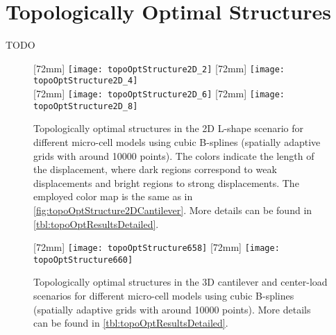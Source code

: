 \chapter{Topologically Optimal Structures}
\label{chap:a30structures}

TODO

\begin{figure}
  [72mm]{%
    \texttt{[image: topoOptStructure2D\_2]}%
  }%
  \hfill%
  [72mm]{%
    \texttt{[image: topoOptStructure2D\_4]}%
  }%
  \\[2mm]%
  [72mm]{%
    \texttt{[image: topoOptStructure2D\_6]}%
  }%
  \hfill%
  [72mm]{%
    \texttt{[image: topoOptStructure2D\_8]}%
  }%
  \caption[Optimal structures in the 2D L-shape scenario]{%
    Topologically optimal structures in the 2D L-shape scenario
    for different micro-cell models using cubic B-splines
    (spatially adaptive grids with around \num{10000} points).
    The colors indicate the length of the displacement,
    where dark regions correspond to weak displacements and
    bright regions to strong displacements.
    The employed color map is the same as in
    \cref{fig:topoOptStructure2DCantilever}.
    More details can be found in \cref{tbl:topoOptResultsDetailed}.%
  }%
  \label{fig:topoOptStructure2DLShape}%
\end{figure}

\begin{figure}
  \newcommand*{\myscale}{0.19}%
  [72mm]{%
    \texttt{[image: topoOptStructure658]}%
  }%
  \hfill%
  [72mm]{%
    \texttt{[image: topoOptStructure660]}%
  }%
  \\[2mm]%
  \hspace*{6mm}
  \caption[Optimal structures in the 3D scenarios]{%
    Topologically optimal structures in the
    3D cantilever and center-load scenarios
    for different micro-cell models using cubic B-splines
    (spatially adaptive grids with around \num{10000} points).
    More details can be found in \cref{tbl:topoOptResultsDetailed}.%
  }%
  \label{fig:topoOptStructure3D}%
\end{figure}

